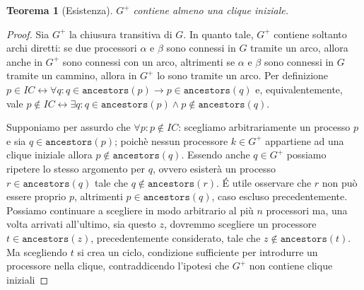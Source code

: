 \documentclass{article}
\newtheorem{teorema}{Teorema}
\begin{document}
\begin{teorema}[Esistenza]
\label{teorema:esistenzaInitialClique}
  $G^+$ contiene almeno una clique iniziale.
\end{teorema}
\begin{proof}
  Sia $G^+$ la chiusura transitiva di $G$. In quanto tale, $G^+$
  contiene soltanto archi diretti: se due processori $\alpha$ e
  $\beta$ sono connessi in $G$ tramite un arco, allora anche in $G^+$
  sono connessi con un arco, altrimenti se $\alpha$ e $\beta$ sono
  connessi in $G$ tramite un cammino, allora in $G^+$ lo sono tramite
  un arco. Per definizione $p\in IC\leftrightarrow\forall q:
  q\in\texttt{ancestors}(p)\rightarrow p\in\texttt{ancestors}(q)$ e,
  equivalentemente, vale $p\not\in IC\leftrightarrow\exists q:
  q\in\texttt{ancestors}(p)\wedge p\not\in\texttt{ancestors}(q)$.

  Supponiamo per assurdo che $\forall p: p\not\in IC$: scegliamo
  arbitrariamente un processo $p$ e sia $q \in \texttt{ancestors}(p)$;
  poichè nessun processore $k \in G^+$ appartiene ad una clique
  iniziale allora $p \not \in \texttt{ancestors}(q)$. Essendo anche $q
  \in G^+$ possiamo ripetere lo stesso argomento per $q$, ovvero
  esisterà un processo $r \in \texttt{ancestors}(q)$ tale che $q \not
  \in \texttt{ancestors}(r)$. \'E utile osservare che $r$ non può
  essere proprio $p$, altrimenti $p \in \texttt{ancestors}(q)$, caso
  escluso precedentemente. Possiamo continuare a scegliere in modo
  arbitrario al più $n$ processori ma, una volta arrivati all'ultimo,
  sia questo $z$, dovremmo scegliere un processore $t \in
  \texttt{ancestors}(z)$, precedentemente considerato, tale che $z
  \not \in \texttt{ancestors}(t)$. Ma scegliendo $t$ si crea un ciclo,
  condizione sufficiente per introdurre un processore nella clique,
  contraddicendo l'ipotesi che $G^+$ non contiene clique
  iniziali
\end{proof}
\end{document}
